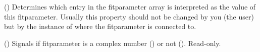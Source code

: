 \documentclass[letterpaper,10pt,english]{sphinxmanual}
\begin{document}
\begin{fulllineitems}
\begin{fulllineitems}
\end{fulllineitems}


\begin{fulllineitems}
\label{\detokenize{modules-api/parameters:Parameters.Fitparameter.index}}
() Determines which entry in the fitparameter array is interpreted as the value of this fitparameter.
Usually this property should not be changed by you (the user) but by the instance of {\hyperref[\detokenize{modules-api/parameters:Parameters.ParameterPool}]{}} where the fitparameter is connected to.

\end{fulllineitems}


\begin{fulllineitems}
\label{\detokenize{modules-api/parameters:Parameters.Fitparameter.complex}}
() Signals if fitparameter is a complex number () or not (). Read-only.

\end{fulllineitems}


\end{fulllineitems}

\end{document}
